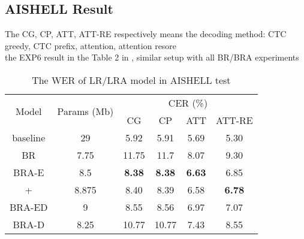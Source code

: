 \documentclass{INTERSPEECH2023}
\begin{document}
\subsection{AISHELL Result}
\begin{table}[] \footnotesize
\centering
\caption{The WER of LR/LRA model in AISHELL test}
 The CG, CP, ATT, ATT-RE respectively means the decoding method: CTC greedy, CTC prefix, attention, attention resore \\
 the EXP6 result in the Table 2 in \cite{gao2021extremely}, similar setup with all BR/BRA experiments
\begin{tabular}{|c|c|cccc|}
\hline
\multirow{2}{*}{Model}                                & \multirow{2}{*}{Params (Mb)} & \multicolumn{4}{c|}{CER (\%)}                                                                       \\ \cline{3-6} 
                                                      &                           & \multicolumn{1}{c|}{CG}         & \multicolumn{1}{c|}{CP}         & \multicolumn{1}{c|}{ATT} & ATT-RE     \\ \hline
baseline                                              & 29                        & \multicolumn{1}{c|}{5.92}       & \multicolumn{1}{c|}{5.91}       & \multicolumn{1}{c|}{5.69}      & 5.30 \\ \hline
BR                                                    & 7.75                      & \multicolumn{1}{c|}{11.75}      & \multicolumn{1}{c|}{11.7}       & \multicolumn{1}{c|}{8.07}      & 9.30 \\ \hline \hline
BRA-E                                                 & 8.5                       & \multicolumn{1}{c|}{\textbf{8.38}}       & \multicolumn{1}{c|}{\textbf{8.38}}       & \multicolumn{1}{c|}{\textbf{6.63}}      & 6.85 \\ \hline
\multicolumn{1}{|c|}{+  } & 8.875 & \multicolumn{1}{c|}{8.40}       & \multicolumn{1}{c|}{8.39}       & \multicolumn{1}{c|}{6.58}          & \multicolumn{1}{c|}{\textbf{6.78}} \\ \hline
BRA-ED                                                & 9                         & \multicolumn{1}{c|}{8.55}       & \multicolumn{1}{c|}{8.56}       & \multicolumn{1}{c|}{6.97}      & 7.07                  \\ \hline
BRA-D                                                 & 8.25                      & \multicolumn{1}{c|}{10.77}      & \multicolumn{1}{c|}{10.77}      & \multicolumn{1}{c|}{7.43}      & 8.55                  \\ \hline \hline

\end{tabular}
\end{table}
\end{document}
